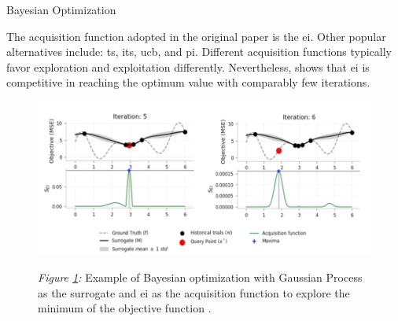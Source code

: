 \begin{algorithm}[t]
  \caption{Bayesian Optimization}
  \label{alg:BO}
 \end{algorithm}

The acquisition function adopted in the original paper \cite{Mockus1978} is the \gls{ei}. Other popular alternatives include: \gls{ts}, \gls{its}, \gls{ucb}, and \gls{pi}. Different acquisition functions typically favor exploration and exploitation differently. Nevertheless, \cite{agnihotri2020exploring} shows that \gls{ei} is competitive in reaching the optimum value with comparably few iterations. 

\begin{figure}[htbp]
	\centering
	\includegraphics[scale=0.4]{figs/overview_bo.png}
	\label{fig: bo}
	\parbox{\linewidth}{
	\vspace{0.5em}
 	{\small \textit{Figure \ref{fig: bo}:} Example of Bayesian optimization with Gaussian Process as the surrogate and \gls{ei} as the acquisition function to explore the minimum of the objective function \cite{agnihotri2020exploring}.
 	}
 	}
\end{figure}

